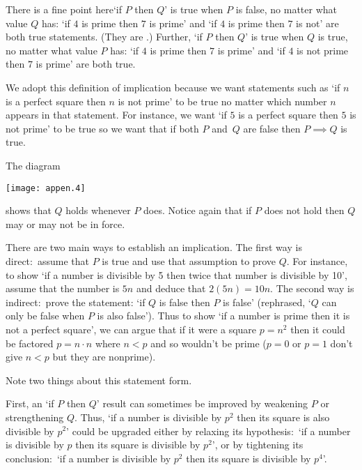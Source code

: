 There is a fine point here\Dash `if \( P \) then \( Q \)' is
true when \( P \) is false, no matter what value $Q$ has:
`if \( 4 \) is prime then \( 7 \) is prime' and
`if \( 4 \) is prime then \( 7 \) is not' are both true statements.
(They are .)
Further, `if \( P \) then \( Q \)' is true when $Q$ is true, no matter 
what value $P$ has: `if $4$ is prime then $7$ is prime' and 
`if $4$ is not prime then $7$ is prime' are both true.

We adopt this definition of implication
because we want statements 
such as `if $n$ is a perfect square then $n$ is not prime'
to be true no matter which 
number $n$ appears in that statement.
For instance, we want `if $5$ is a perfect square then $5$ is not prime'
to be true so we want that if both $P$ and~$Q$ are false then
$P\implies Q$ is true.

The diagram
\begin{center}
  \texttt{[image: appen.4]}
\end{center}
shows that \( Q \) holds whenever \( P \) does.
Notice again that if \( P \) does not hold then \( Q \) may or may not
be in force.

There are two main ways to establish an implication.
The first way is direct:~assume that \( P \) is true and use that
assumption to prove \( Q \).
For instance,
to show `if a number is divisible by 5 then twice that
number is divisible by 10', assume that the number is \( 5n \) and
deduce that \( 2(5n)=10n \).
The second way is indirect:~prove the 
statement: `if \( Q \) is false then \( P \) is false'
(rephrased, `\( Q \) can only be false when \( P \) is also false').
Thus to show `if a number is prime then it
is not a perfect square', we can 
argue that if it were a square \( p=n^2 \) then it could be
factored \( p=n\cdot n \) where \( n<p \) and so wouldn't be prime
(\( p=0 \) or \( p=1 \) don't give \( n<p \) but they
are nonprime).

Note two things about this statement form.

First, an `if \( P \) then \( Q \)' result can sometimes be improved
by weakening \( P \) or strengthening \( Q \).
Thus, `if a number is divisible by \( p^2 \) then its square is also
divisible by \( p^2 \)' could be upgraded either by relaxing its
hypothesis:~`if a number is divisible by \( p \) then its square
is divisible by \( p^2 \)', or by tightening its conclusion:~`if
a number is divisible by \( p^2 \) then its square is divisible by
\( p^4 \)'.

